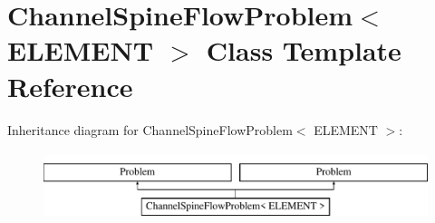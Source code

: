 \hypertarget{classChannelSpineFlowProblem}{}\section{Channel\+Spine\+Flow\+Problem$<$ E\+L\+E\+M\+E\+NT $>$ Class Template Reference}
\label{classChannelSpineFlowProblem}
Inheritance diagram for Channel\+Spine\+Flow\+Problem$<$ E\+L\+E\+M\+E\+NT $>$\+:\begin{figure}[H]
\begin{center}
\leavevmode
\includegraphics[height=2.000000cm]{classChannelSpineFlowProblem}
\end{center}
\end{figure}
